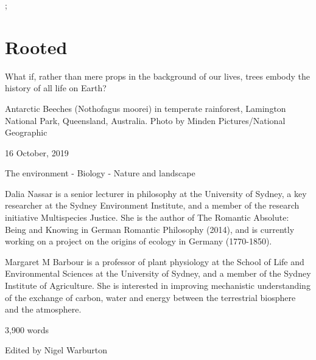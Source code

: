 \documentclass[../main.tex]{subfiles}
\begin{document}
;
\chapter{Rooted}
\begin{subtitle}
What if, rather than mere props in the background of our lives, trees embody the history of all life on Earth?
\end{subtitle}

\begin{metadata}
\begin{flushright}Antarctic Beeches (Nothofagus moorei) in temperate rainforest, Lamington National Park, Queensland, Australia. Photo by Minden Pictures/National Geographic\end{flushright}

\begin{flushright}16 October, 2019\end{flushright}

The environment - Biology - Nature and landscape

  Dalia Nassar  is a senior lecturer in philosophy at the University of Sydney, a key researcher at the Sydney Environment Institute, and a member of the research initiative Multispecies Justice. She is the author of The Romantic Absolute: Being and Knowing in German Romantic Philosophy (2014), and is currently working on a project on the origins of ecology in Germany (1770-1850).  

  Margaret M Barbour  is a professor of plant physiology at the School of Life and Environmental Sciences at the University of Sydney, and a member of the Sydney Institute of Agriculture. She is interested in improving mechanistic understanding of the exchange of carbon, water and energy between the terrestrial biosphere and the atmosphere. 

3,900 words

 Edited by Nigel Warburton 
\end{metadata}
\end{document}

